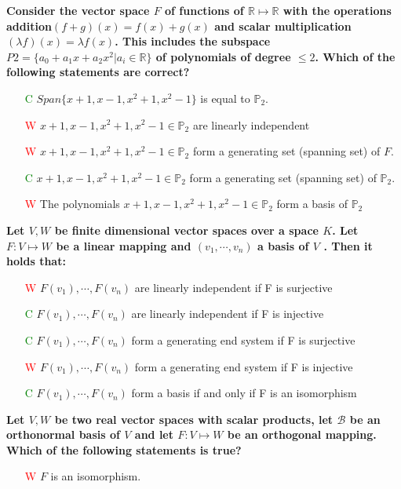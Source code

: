 \documentclass[7pt,landscape, margin = 0.1mm]{article}
\begin{document}
\begin{multicols}{4}
\begin{flushleft}
\textbf{ Consider the vector space $F$ of functions of $\mathbb{R} \mapsto \mathbb{R}$ with the operations addition$ (f + g)(x) =
f(x)+g(x)$ and scalar multiplication $(\lambda f)(x) = \lambda f(x)$. This includes the subspace $P2 = \{a_0 +a_1 x+
a_2 x^2 | a_i \in \mathbb{R} \} $ of polynomials of degree $\leq 2$. Which of the following statements are correct? }
\begin{itemize}
\item[\textcolor{green}{C}] $ Span\{x + 1, x − 1, x^2 + 1, x^2 − 1\}$ is equal to $\mathbb{P}_2$.
\item[\textcolor{red}{W}] $x + 1, x − 1, x^2 + 1, x^2 − 1 \in \mathbb{P}_2$ are linearly independent
\item[\textcolor{red}{W}]  $x + 1, x − 1, x^2 + 1, x^2 − 1 \in \mathbb{P}_2$ form a generating set (spanning set) of $F$.
\item[\textcolor{green}{C}]   $x + 1, x − 1, x^2 + 1, x^2 − 1 \in \mathbb{P}_2$ form a generating set (spanning set) of $\mathbb{P}_2$.
\item[\textcolor{red}{W}] The polynomials $x + 1, x − 1, x^2 + 1, x^2 − 1 \in \mathbb{P}_2$ form a basis of $\mathbb{P}_2$
\end{itemize}
\hspace{3mm}
\textbf{ Let $V , W$ be finite dimensional vector spaces over a space $K$. Let $F : V \mapsto W$ be a linear mapping
and $(v_1, \cdots , v_n)$ a basis of $V$ . Then it holds that:}
\begin{itemize}
\item[\textcolor{red}{W}] $F(v_1) ,\cdots, F(v_n)$ are linearly independent if F is surjective
\item[\textcolor{green}{C}]  $F(v_1) ,\cdots, F(v_n)$ are linearly independent if F is injective
\item[\textcolor{green}{C}]  $F(v_1) ,\cdots, F(v_n)$ form a generating end system if F is surjective
\item[\textcolor{red}{W}]  $F(v_1) ,\cdots, F(v_n)$ form a generating end system if F is injective
\item[\textcolor{green}{C}]  $F(v_1) ,\cdots, F(v_n)$ form a basis if and only if F is an isomorphism
\end{itemize} 
\textbf{ Let $V,W$ be two real vector spaces with scalar products, let $\mathcal{B}$ be an orthonormal basis of $V$ and let
$F : V \mapsto W$ be an orthogonal mapping. Which of the following statements is true? }
\begin{itemize}
\item[\textcolor{red}{W}] $F$ is an isomorphism. 

\end{itemize}
\end{flushleft}
\end{multicols}
\end{document}
